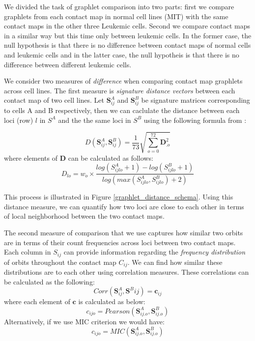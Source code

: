 \documentclass[a4,center,fleqn]{NAR}
\begin{document}
We divided the task of graphlet comparison into two parts: first we compare
graphlets from each contact map in normal cell lines (MIT) with the 
same contact maps in the other three Leukemic cells. Second we compare 
contact maps in a similar way but this time only between leukemic cells.
In the former case, the null hypothesis is that there is no difference
between contact maps of normal cells and leukemic cells and in the latter
case, the null hypotheis is that there is no difference between 
different leukemic cells.

We consider two measures of \textit{difference} when comparing contact
map graphlets across cell lines. 
The first measure is \textit{signature distance vectors} between
each contact map of two cell lines. 
Let  $\mathbf{S}^A_{ij}$  and $\mathbf{S}^B_{ij}$ be
signature matrices corresponding  to cells A and B
respectively, then we can caclulate the 
distance between each
loci (row) $l$ in $S^A$ and the the same loci in $S^B$
using the following formula from \cite{prvzulj2007biological}:

\begin{equation}
    D(\mathbf{S}^A_{ij}, \mathbf{S}^B_{ij}) = 
    \frac{1}{73}\sqrt{\sum_{o=0}^{72}{\mathbf{D}_{.o}^2}}
    \label{eq:distance_total}
\end{equation}
where elements of $\mathbf{D}$ can be calculated as follows:
\begin{equation}
    D_{lo} = w_o \times 
        \frac{log(S_{ijlo}^A+1) - log(S_{ijlo}^B+1)}
             {log(max(S_{ijlo}^A, S_{ijlo}^B) + 2)}
    \label{eq:distance_single}
\end{equation}

This process is illustrated in Figure \ref{graphlet_distance_schema}.
Using this distance measure, we can quantify how two loci are close to
each other in terms of local neighborhood between the two contact maps.

The second measure of comparison that we use captures how 
similar two orbits are in terms of their count 
frequencies across loci between two contact maps. 
Each column in $S_{ij}$ can provide information
regarding the \textit{frequency distribution} of orbits throughout
the contact map $C_{ij}$. 
We can find how similar these distributions are to each other using
correlation measures.
These correlations can be calculated as the following:
\begin{equation}
    Corr(\mathbf{S}^A_{ij}, \mathbf{S}^B{ij}) = \mathbf{c}_{ij}
    \label{eq:correlation}
\end{equation}
where each element of $\mathbf{c}$ is calculated as below:
\begin{equation}
    c_{ijo} = Pearson(\mathbf{S}^A_{ij.o}, \mathbf{S}^B_{ij.o})
    \label{eq:pearson}
\end{equation}
Alternatively, if we use MIC criterion we would have:
\begin{equation}
    c_{ijo} = MIC(\mathbf{S}^A_{ij.o}, \mathbf{S}^B_{ij.o})
    \label{eq:mic}
\end{equation}
\end{document}
